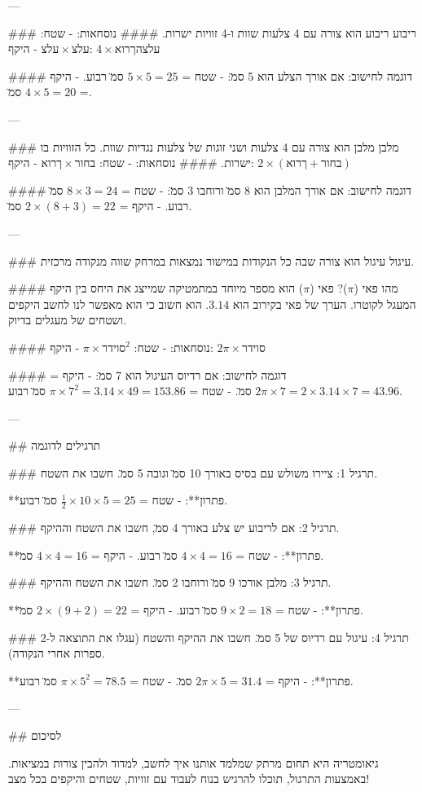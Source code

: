 ---

### ריבוע
ריבוע הוא צורה עם 4 צלעות שוות ו-4 זוויות ישרות.
#### נוסחאות:
- שטח: $צלע \times צלע$
- היקף: $4 \times אורך הצלע$

#### דוגמה לחישוב:
אם אורך הצלע הוא 5 ס\"מ:
- שטח = $5 \times 5 = 25$ ס\"מ רבוע.
- היקף = $4 \times 5 = 20$ ס\"מ.

---

### מלבן
מלבן הוא צורה עם 4 צלעות ושני זוגות של צלעות נגדיות שוות. כל הזוויות בו ישרות.
#### נוסחאות:
- שטח: $אורך \times רוחב$
- היקף: $2 \times (אורך + רוחב)$

#### דוגמה לחישוב:
אם אורך המלבן הוא 8 ס\"מ ורוחבו 3 ס\"מ:
- שטח = $8 \times 3 = 24$ ס\"מ רבוע.
- היקף = $2 \times (8 + 3) = 22$ ס\"מ.

---

### עיגול
עיגול הוא צורה שבה כל הנקודות במישור נמצאות במרחק שווה מנקודה מרכזית.

#### מהו פאי ($\pi$)?
פאי ($\pi$) הוא מספר מיוחד במתמטיקה שמייצג את היחס בין היקף המעגל לקוטרו. הערך של פאי בקירוב הוא $3.14$. הוא חשוב כי הוא מאפשר לנו לחשב היקפים ושטחים של מעגלים בדיוק.

#### נוסחאות:
- שטח: $\pi \times רדיוס^2$
- היקף: $2 \pi \times רדיוס$

#### דוגמה לחישוב:
אם רדיוס העיגול הוא 7 ס\"מ:
- היקף = $2 \pi \times 7 = 2 \times 3.14 \times 7 = 43.96$ ס\"מ.
- שטח = $\pi \times 7^2 = 3.14 \times 49 = 153.86$ ס\"מ רבוע.

---

## תרגילים לדוגמה

### תרגיל 1:
ציירו משולש עם בסיס באורך 10 ס\"מ וגובה 5 ס\"מ. חשבו את השטח.

**פתרון**: 
- שטח = $\frac{1}{2} \times 10 \times 5 = 25$ ס\"מ רבוע.

### תרגיל 2:
אם לריבוע יש צלע באורך 4 ס\"מ, חשבו את השטח וההיקף.

**פתרון**: 
- שטח = $4 \times 4 = 16$ ס\"מ רבוע.
- היקף = $4 \times 4 = 16$ ס\"מ.

### תרגיל 3:
מלבן אורכו 9 ס\"מ ורוחבו 2 ס\"מ. חשבו את השטח וההיקף.

**פתרון**: 
- שטח = $9 \times 2 = 18$ ס\"מ רבוע.
- היקף = $2 \times (9 + 2) = 22$ ס\"מ.

### תרגיל 4:
עיגול עם רדיוס של 5 ס\"מ. חשבו את ההיקף והשטח (עגלו את התוצאה ל-2 ספרות אחרי הנקודה).

**פתרון**: 
- היקף = $2 \pi \times 5 = 31.4$ ס\"מ.
- שטח = $\pi \times 5^2 = 78.5$ ס\"מ רבוע.

---

## לסיכום

גיאומטריה היא תחום מרתק שמלמד אותנו איך לחשב, למדוד ולהבין צורות במציאות. באמצעות התרגול, תוכלו להרגיש בנוח לעבוד עם זוויות, שטחים והיקפים בכל מצב!
